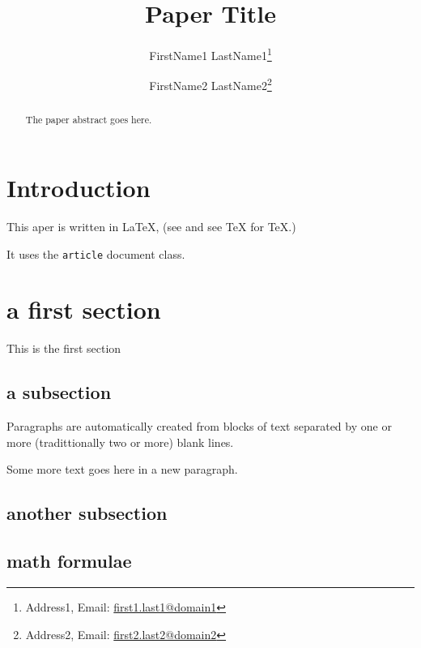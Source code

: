 \documentclass[12pt,a4paper]{article}
\title{Paper Title}
\author{%
  FirstName1 LastName1\thanks{Address1, Email: \href{mailto:first1.last1@domain1}{first1.last1@domain1}}%
  \and
  FirstName2 LastName2\thanks{Address2, Email: \href{mailto:first2.last2@domain2}{first2.last2@domain2}}%
}
\begin{document}
\maketitle

\begin{abstract}

The paper abstract goes here.

\end{abstract}

\pagestyle{headings}


\cleardoublepage
{} %
\tableofcontents

\section*{Introduction}


This aper is  written in {\LaTeX}, (see \cite{latex2e} and see  {\TeX} \cite{texbook} for {\TeX}.)

It uses the \texttt{article} document class.





\section{a first section}
\label{sec:first}

This  is the first section

\subsection{a subsection}

Paragraphs are automatically created from blocks of text separated by one or more (tradittionally two or more)
blank lines.


Some more text goes here in a new paragraph.




\subsection{another subsection}


\subsection{math formulae}
\end{document}
